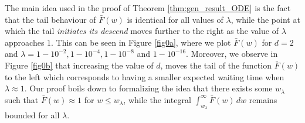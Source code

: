 \documentclass[12pt]{report}
\begin{document}
The main idea used in the proof of Theorem \ref{thm:gen_result_ODE} is the fact that the tail behaviour of $\bar F(w)$ is identical for all values of $\lambda$, while the point at which the tail \textit{initiates its descend} moves further to the right as the value of $\lambda$ approaches $1$. This can be seen in Figure \ref{fig0a}, where we plot $\bar F(w)$ for $d=2$ and $\lambda=1-10^{-2}, 1-10^{-4}, 1-10^{-8}$ and $1-10^{-16}$. Moreover, we observe in Figure \ref{fig0b} that increasing the value of $d$, moves the tail of the function $\bar F(w)$ to the left which corresponds to having a smaller expected waiting time when $\lambda \approx 1$. Our proof boils down to formalizing the idea that there exists some $w_{\lambda}$ such that $\bar F(w) \approx 1$ for $w \leq w_\lambda$, while the integral $\int_{w_{\lambda}}^\infty \bar F(w) \, dw$ remains bounded for all $\lambda$.  
\end{document}
